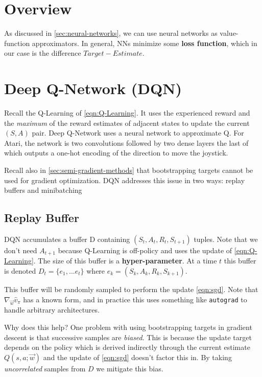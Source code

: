 \documentclass[11pt]{report}
\begin{document}
\section{Overview}
As discussed in \autoref{sec:neural-networks}, we can use neural networks as value-function approximators. In general, NNs minimize some \textbf{loss function}, which in our case is the difference $Target - Estimate$.

\section{Deep Q-Network (DQN)}\label{sec:dqn}

Recall the Q-Learning of \autoref{eqn:Q-Learning}. It uses the experienced reward and the \textit{maximum} of the reward estimates of adjacent states to update the current $(S, A)$ pair. Deep Q-Network uses a neural network to approximate Q. For Atari, the network is two convolutions followed by two dense layers the last of which outputs a one-hot encoding of the direction to move the joystick.

Recall also in \autoref{sec:semi-gradient-methods} that bootstrapping targets cannot be used for gradient optimization. DQN addresses this issue in two ways: replay buffers and minibatching

\subsection{Replay Buffer}
DQN accumulates a buffer D containing $(S_t, A_t, R_t, S_{t+1})$ tuples. Note that we don't need $A_{t+1}$ because Q-Learning is off-policy and uses the update of \autoref{eqn:Q-Learning}. The size of this buffer is a \textbf{hyper-parameter}. At a time $t$ this buffer is denoted $D_t = \{e_1, ... e_t\}$ where $e_k = (S_k, A_k, R_k, S_{k+1})$.

This buffer will be randomly sampled to perform the update \autoref{eqn:sgd}. Note that $\nabla_{\vec{w}}\hat{v}_\pi$ has a known form, and in practice this uses something like \texttt{autograd} to handle arbitrary architectures.

Why does this help? One problem with using bootstrapping targets in gradient descent is that successive samples are \textit{biased}. This is because the update target depends on the policy which is derived indirectly through the current estimate $Q(s, a; \vec{w})$ and the update of \autoref{eqn:sgd} doesn't factor this in. By taking \textit{uncorrelated} samples from $D$ we mitigate this bias.
\end{document}

